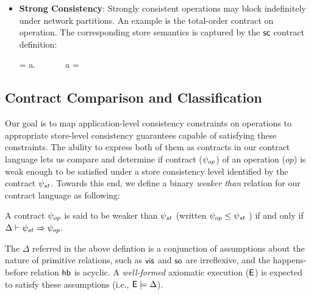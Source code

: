 \begin{itemize}
\item \textbf{Strong Consistency}: Strongly consistent operations may block
  indefinitely under network partitions. An example is the total-order
  contract on  operation. The corresponding store semantics is
  captured by the ${\sf sc}$ contract definition:

  \vspace{-1em}
  \begin{smathpar}
  \scc = \forall a.~ \Rightarrow {} ~\vee~  ~\vee~ a = \cureff
  \end{smathpar}

\end{itemize}





\subsection{Contract Comparison and Classification}

Our goal is to map application-level consistency constraints on
operations to appropriate store-level consistency guarantees capable
of satisfying these constraints.  The ability to express both of them as
contracts in our contract language lets us compare and determine if
contract ($\psi_{op}$) of an operation ($op$) is weak enough to be
satisfied under a store consistency level identified by the contract
$\psi_{st}$. Towards this end, we define a binary \emph{weaker than}
relation for our contract language as following:

\begin{definition}
A contract $\psi_{op}$ is said to be weaker than $\psi_{st}$ (written $\psi_{op}
\le \psi_{st}$ ) if and only if $\Delta \vdash \psi_{st} \Rightarrow \psi_{op}$.
\begin{center}
\end{center}
\end{definition}

\vspace{-1em}
\noindent The $\Delta$ referred in the above defintion is a
conjunction of assumptions about the nature of primitive relations,
such as ${\normalfont \textsf{vis}}$ and ${\normalfont \textsf{so}}$ are irreflexive, and the happens-before
relation ${\normalfont \textsf{hb}}$ is acyclic. A \emph{well-formed} axiomatic execution
(${\normalfont \textsf{E}}$) is expected to satisfy these assumptions (i.e., ${\normalfont \textsf{E}} \models
\Delta$).

